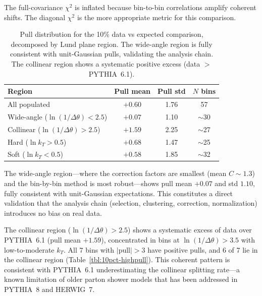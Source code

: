 \documentclass[11pt,a4paper]{article}
\begin{document}
The full-covariance $\chi^2$ is inflated because bin-to-bin correlations
amplify coherent shifts.  The diagonal $\chi^2$ is the more appropriate
metric for this comparison.

\begin{table}[htbp]
\centering
\caption{Pull distribution for the 10\% data vs expected comparison,
  decomposed by Lund plane region.  The wide-angle region is fully
  consistent with unit-Gaussian pulls, validating the analysis chain.
  The collinear region shows a systematic positive excess (data
  $>$ PYTHIA~6.1).}
\label{tbl:10pct-pulls}
\begin{tabular}{lccc}
\toprule
Region & Pull mean & Pull std & $N$ bins \\
\midrule
All populated & $+0.60$ & 1.76 & 57 \\
Wide-angle ($\ln(1/\Delta\theta) < 2.5$) & $+0.07$ & 1.10 & $\sim$30 \\
Collinear ($\ln(1/\Delta\theta) > 2.5$) & $+1.59$ & 2.25 & $\sim$27 \\
Hard ($\ln k_T > 0.5$) & $+0.68$ & 1.47 & $\sim$25 \\
Soft ($\ln k_T < 0.5$) & $+0.58$ & 1.85 & $\sim$32 \\
\bottomrule
\end{tabular}
\end{table}

The wide-angle region---where the correction factors are smallest (mean
$C \sim 1.3$) and the bin-by-bin method is most robust---shows pull
mean $+0.07$ and std $1.10$, fully consistent with unit-Gaussian
expectations.  This constitutes a direct validation that the analysis
chain (selection, clustering, correction, normalization) introduces no
bias on real data.

The collinear region ($\ln(1/\Delta\theta) > 2.5$) shows a systematic
excess of data over PYTHIA~6.1 (pull mean $+1.59$), concentrated in
bins at $\ln(1/\Delta\theta) > 3.5$ with low-to-moderate $k_T$.  All 7
bins with $|\text{pull}| > 3$ have positive pulls, and 6 of 7 lie in
the collinear region (Table~\ref{tbl:10pct-highpull}).  This coherent
pattern is consistent with PYTHIA~6.1 underestimating the collinear
splitting rate---a known limitation of older parton shower models that
has been addressed in PYTHIA~8 and HERWIG~7.
\end{document}
